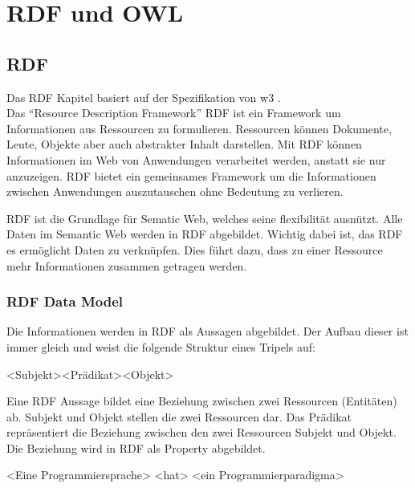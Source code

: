 \chapter{RDF und OWL}
\label{chap:owl_Rdf}

\section{RDF}
\label{sec:owlRdf_rdf}

Das RDF Kapitel basiert auf der Spezifikation von w3 \cite{w3rdf}.\\
Das "`Resource Description Framework"' RDF ist ein Framework um Informationen aus Ressourcen zu formulieren. Ressourcen können Dokumente, Leute, Objekte aber auch abstrakter Inhalt darstellen. Mit RDF können Informationen im Web von Anwendungen verarbeitet werden, anstatt sie nur anzuzeigen. RDF bietet ein gemeinsames Framework um die Informationen zwischen Anwendungen auszutauschen ohne Bedeutung zu verlieren. 

RDF ist die Grundlage für Sematic Web, welches seine flexibilität ausnützt. Alle Daten im Semantic Web werden in RDF abgebildet. Wichtig dabei ist, das RDF es ermöglicht Daten zu verknüpfen. Dies führt dazu, dass zu einer Ressource mehr Informationen zusammen getragen werden.\cite{cambSemRDF}

\subsection{RDF Data Model}
\label{sec:owlRdf_rdf_dataModel}
Die Informationen werden in RDF als Aussagen abgebildet. Der Aufbau dieser  ist immer gleich und weist die folgende Struktur eines Tripels auf:

\noindent\hspace*{15mm}<Subjekt><Prädikat><Objekt>

Eine RDF Aussage bildet eine Beziehung zwischen zwei Ressourcen (Entitäten) ab. 
Subjekt und Objekt stellen die zwei Ressourcen dar. Das Prädikat repräsentiert die Beziehung zwischen den zwei Ressourcen Subjekt und Objekt. Die Beziehung wird in RDF als Property abgebildet. 
 
\noindent\hspace*{15mm} <Eine Programmiersprache> <hat> <ein Programmierparadigma>


